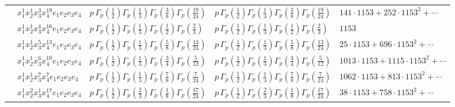 \documentclass[11pt]{article}
\begin{document}
\begin{table}[ht]
{\begin{tabular}{@{}lllll@{}}
 & $x_{1}^{1} x_{2}^{1} x_{3}^{3} x_{4}^{19}  e_{1} e_{2} e_{3} e_{4}$ & $p \, \Gamma_p \left( \frac{1}{2} \right) \Gamma_p \left( \frac{1}{3} \right) \Gamma_p \left( \frac{3}{8} \right) \Gamma_p \left( \frac{19}{24} \right)$ & $p \, \Gamma_p \left( \frac{1}{2} \right) \Gamma_p \left( \frac{1}{3} \right) \Gamma_p \left( \frac{3}{8} \right) \Gamma_p \left( \frac{19}{24} \right)$ & $141{\cdot}1153{+}252{\cdot}1153^{2}{+}\cdots$ \\
 & $x_{1}^{1} x_{2}^{1} x_{3}^{4} x_{4}^{16}  e_{1} e_{2} e_{3} e_{4}$ & $p \, \Gamma_p \left( \frac{1}{2} \right) \Gamma_p \left( \frac{1}{3} \right) \Gamma_p \left( \frac{1}{2} \right) \Gamma_p \left( \frac{2}{3} \right)$ & $p \, \Gamma_p \left( \frac{1}{2} \right) \Gamma_p \left( \frac{1}{3} \right) \Gamma_p \left( \frac{1}{2} \right) \Gamma_p \left( \frac{2}{3} \right)$ & $1153$ \\
 & $x_{1}^{1} x_{2}^{1} x_{3}^{5} x_{4}^{13}  e_{1} e_{2} e_{3} e_{4}$ & $p \, \Gamma_p \left( \frac{1}{2} \right) \Gamma_p \left( \frac{1}{3} \right) \Gamma_p \left( \frac{5}{8} \right) \Gamma_p \left( \frac{13}{24} \right)$ & $p \, \Gamma_p \left( \frac{1}{2} \right) \Gamma_p \left( \frac{1}{3} \right) \Gamma_p \left( \frac{5}{8} \right) \Gamma_p \left( \frac{13}{24} \right)$ & $25{\cdot}1153{+}696{\cdot}1153^{2}{+}\cdots$ \\
 & $x_{1}^{1} x_{2}^{1} x_{3}^{6} x_{4}^{10}  e_{1} e_{2} e_{3} e_{4}$ & $p \, \Gamma_p \left( \frac{1}{2} \right) \Gamma_p \left( \frac{1}{3} \right) \Gamma_p \left( \frac{3}{4} \right) \Gamma_p \left( \frac{5}{12} \right)$ & $p \, \Gamma_p \left( \frac{1}{2} \right) \Gamma_p \left( \frac{1}{3} \right) \Gamma_p \left( \frac{3}{4} \right) \Gamma_p \left( \frac{5}{12} \right)$ & $1013{\cdot}1153{+}1115{\cdot}1153^{2}{+}\cdots$ \\
 & $x_{1}^{1} x_{2}^{1} x_{3}^{7} x_{4}^{7}  e_{1} e_{2} e_{3} e_{4}$ & $p \, \Gamma_p \left( \frac{1}{2} \right) \Gamma_p \left( \frac{1}{3} \right) \Gamma_p \left( \frac{7}{8} \right) \Gamma_p \left( \frac{7}{24} \right)$ & $p \, \Gamma_p \left( \frac{1}{2} \right) \Gamma_p \left( \frac{1}{3} \right) \Gamma_p \left( \frac{7}{8} \right) \Gamma_p \left( \frac{7}{24} \right)$ & $1062{\cdot}1153{+}813{\cdot}1153^{2}{+}\cdots$ \\
 & $x_{1}^{1} x_{2}^{2} x_{3}^{1} x_{4}^{17}  e_{1} e_{2} e_{3} e_{4}$ & $p \, \Gamma_p \left( \frac{1}{2} \right) \Gamma_p \left( \frac{2}{3} \right) \Gamma_p \left( \frac{1}{8} \right) \Gamma_p \left( \frac{17}{24} \right)$ & $p \, \Gamma_p \left( \frac{1}{2} \right) \Gamma_p \left( \frac{2}{3} \right) \Gamma_p \left( \frac{1}{8} \right) \Gamma_p \left( \frac{17}{24} \right)$ & $38{\cdot}1153{+}758{\cdot}1153^{2}{+}\cdots$ \\

\end{tabular}}
\end{table}
\end{document}

